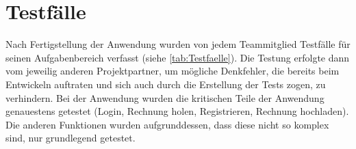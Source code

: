 \documentclass[
fontsize=12pt,
twoside=false,
a4paper,
bibliography=totoc, 		%
listof=totoc,				%
toc=bibliographynumbered, 	%
listof=numbered,			%
]{scrreprt}
\begin{document}



\pagestyle{fancy} %
\fancyhf{} %
\renewcommand*{\chapterpagestyle}{fancy} %
\renewcommand{\headrulewidth}{0pt} %
\setcounter{page}{2} %

\renewcommand*\lstlistingname{Quellcode} 






\tableofcontents






\chapter{Testfälle}
Nach Fertigstellung der Anwendung wurden von jedem Teammitglied Testfälle für seinen Aufgabenbereich verfasst (siehe \ref{tab:Testfaelle}). Die Testung erfolgte dann vom jeweilig anderen Projektpartner, um mögliche Denkfehler, die bereits beim Entwickeln auftraten und sich auch durch die Erstellung der Tests zogen, zu verhindern. Bei der Anwendung wurden die kritischen Teile der Anwendung genauestens getestet (Login, Rechnung holen, Registrieren, Rechnung hochladen). Die anderen Funktionen wurden aufgrunddessen, dass diese nicht so komplex sind, nur grundlegend getestet. 
\end{document}
